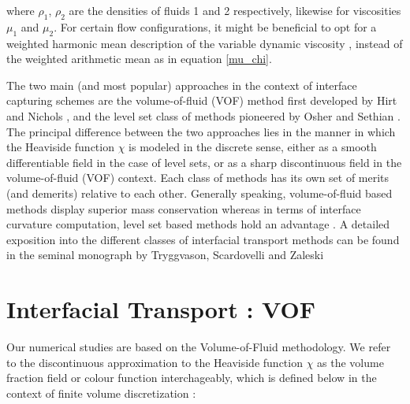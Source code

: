 where $\rho_{1}$, $\rho_{2}$ are the densities of fluids 1 and 2 respectively, 
likewise for viscosities $\mu_{1}$ and $\mu_{2}$. For certain flow configurations, 
it might be beneficial to opt for a weighted harmonic mean description of the 
variable dynamic viscosity , instead of the weighted arithmetic mean as in equation \ref{mu_chi}. 

The two main (and most popular)
approaches in the context of interface capturing schemes are the 
volume-of-fluid (VOF) method first developed by Hirt and Nichols \cite{hirt1981volume}, 
and the level set class of methods pioneered by Osher and Sethian \cite{osher1988fronts}.
The principal difference between the two approaches lies in the manner in which
the Heaviside function $\chi$ is modeled in the discrete sense, 
either as a smooth differentiable field in
the case of level sets, or as a sharp discontinuous field in the volume-of-fluid (VOF) context.  
Each class of methods has its own set of merits (and demerits) relative to each other. 
Generally speaking, volume-of-fluid based methods display superior mass conservation
whereas in terms of interface curvature computation, level set based methods hold an advantage
 . 
A detailed exposition into the different classes of interfacial transport
methods can be found in the seminal monograph by Tryggvason, Scardovelli and Zaleski \cite{zaleskibook}



\section{Interfacial Transport : VOF}

Our numerical studies are based on the Volume-of-Fluid methodology. 
We refer to the discontinuous approximation to the Heaviside function
$\chi$ as the volume fraction field or colour function interchageably, which 
is defined below in the context of finite volume discretization : 

